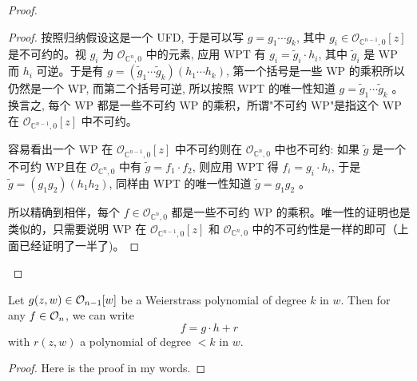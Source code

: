 \documentclass[lang=cn,12pt,a4paper,fontset=none]{beautybook}
\begin{document}
\begin{proof}
\begin{proof}
按照归纳假设这是一个 UFD, 于是可以写 $g=g_1 \cdots g_k$, 其中 $g_i \in \mathcal{O}_{\mathbb{C}^{n-1}, 0}[z]$ 是不可约的。视 $g_i$ 为 $\mathcal{O}_{\mathbb{C}^n, 0}$ 中的元素, 应用 WPT 有 $g_i=\tilde{g}_i \cdot h_i$, 其中 $\tilde{g}_i$ 是 WP 而 $h_i$ 可逆。于是有 $g=\left(\tilde{g}_1 \cdots \tilde{g}_k\right)\left(h_1 \cdots h_k\right)$, 第一个括号是一些 WP 的乘积所以仍然是一个 WP, 而第二个括号可逆, 所以按照 WPT 的唯一性知道 $g=\tilde{g}_1 \cdots \tilde{g}_k$ 。换言之, 每个 WP 都是一些不可约 WP 的乘积，所谓"不可约 WP"是指这个 WP 在 $\mathcal{O}_{\mathbb{C}^{n-1}, 0}[z]$ 中不可约。

容易看出一个 WP 在 $\mathcal{O}_{\mathbb{C}^{n-1}, 0}[z]$ 中不可约则在 $\mathcal{O}_{\mathbb{C}^n, 0}$ 中也不可约: 如果 $\tilde{g}$ 是一个不可约 WP且在 $\mathcal{O}_{\mathbb{C}^n, 0}$ 中有 $\tilde{g}=f_1 \cdot f_2$, 则应用 WPT 得 $f_i=g_i \cdot h_i$, 于是 $\tilde{g}=\left(g_1 g_2\right)\left(h_1 h_2\right)$, 同样由 WPT 的唯一性知道 $\tilde{g}=g_1 g_2$ 。

所以精确到相伴，每个 $f \in \mathcal{O}_{\mathbb{C}^n, 0}$ 都是一些不可约 WP 的乘积。唯一性的证明也是类似的，只需要说明 WP 在 $\mathcal{O}_{\mathbb{C}^{n-1}, 0}[z]$ 和 $\mathcal{O}_{\mathbb{C}^n, 0}$ 中的不可约性是一样的即可（上面已经证明了一半了)。
\end{proof}
   \end{proof}
      

\begin{theorem}
   Let $g(z,w)\in {\mathcal O}_{n-1}[w]$ be a Weierstrass polynomial of degree $k$ in $w$. Then for any $f\in {\mathcal O}_{n}$, we can write 
   \[f=g\cdot h+r\]
   with $r(z,w)$ a polynomial of degree $<k$ in $w$.
\end{theorem}
   \begin{proof}
      Here is the proof in my words. 
      
   \end{proof}







\clearpage
\printbibliography[heading=bibintoc,title={Bibliography}]\printindex\thispagestyle{empty}
\ISBNcode{\EANisbn[ISBN=978-80-7340-097-2]} %
\makebottomcover
\end{document}

